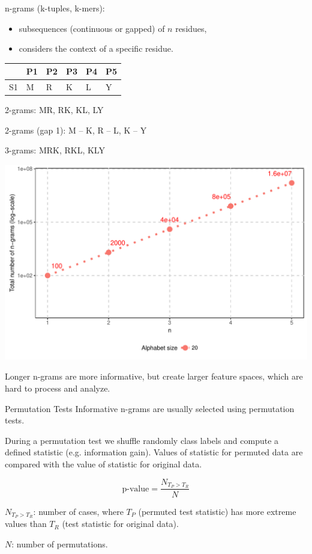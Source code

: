 \documentclass{beamer}\usepackage[]{graphicx}\usepackage[]{color}
\makeatletter
\def\maxwidth{ %
  \ifdim\Gin@nat@width>\linewidth
    \linewidth
  \else
    \Gin@nat@width
  \fi
}
\makeatother
\begin{document}
\begin{frame}
n-grams (k-tuples, k-mers):
\begin{itemize}
\item subsequences (continuous or gapped) of $n$ residues,
\item considers the context of a specific residue.
\end{itemize}


\begin{table}[ht]
\centering
\begin{tabular}{rlllll}
  \hline
 & P1 & P2 & P3 & P4 & P5 \\ 
  \hline
S1 & M & R & K & L & Y \\ 
   \hline
\end{tabular}
\end{table}



2-grams:
MR, RK, KL, LY

2-grams (gap 1):
M -- K, R -- L, K -- Y

3-grams:
MRK, RKL, KLY
\end{frame}  



\begin{frame}

\includegraphics[width=\maxwidth]{figure/unnamed-chunk-5-1} 

Longer n-grams are more informative, but create larger feature spaces, which are hard to process and analyze.
\end{frame}

\begin{frame}{Permutation Tests}
  Informative n-grams are usually selected using permutation tests.

During a permutation test we shuffle randomly class labels and compute a defined statistic (e.g. information gain). Values of statistic for permuted data are compared with the value of statistic for original data.

$$
\textrm{p-value} = \frac{N_{T_P > T_R}}{N} $$

$N_{T_P > T_R}$: number of cases, where $T_P$ (permuted test statistic) has more extreme values than $T_R$ (test statistic for original data).

$N$: number of permutations.
  \end{frame}
\end{document}
